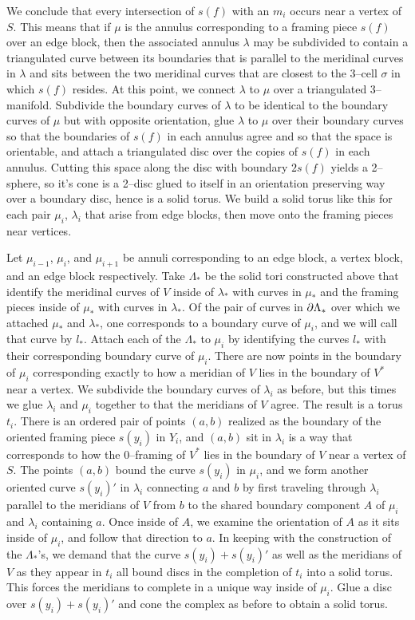 We conclude that every intersection of $s(f)$ with an $m_i$ occurs near a vertex of $S$.
This means that if $\mu$ is the annulus corresponding to a framing piece $s(f)$ over an edge block, then the associated annulus $\lambda$ may be subdivided to contain a triangulated curve between its boundaries that is parallel to the meridinal curves in $\lambda$ and sits between the two meridinal curves that are closest to the 3--cell $\sigma$ in which $s(f)$ resides.
At this point, we connect $\lambda$ to $\mu$ over a triangulated 3--manifold.
Subdivide the boundary curves of $\lambda$ to be identical to the boundary curves of $\mu$ but with opposite orientation, glue $\lambda$ to $\mu$ over their boundary curves so that the boundaries of $s(f)$ in each annulus agree and so that the space is orientable, and attach a triangulated disc over the copies of $s(f)$ in each annulus.
Cutting this space along the disc with boundary $2s(f)$ yields a 2--sphere, so it's cone is a 2--disc glued to itself in an orientation preserving way over a boundary disc, hence is a solid torus.
We build a solid torus like this for each pair $\mu_i$, $\lambda_i$ that arise from edge blocks, then move onto the framing pieces near vertices.

Let $\mu_{i-1}$, $\mu_i$, and $\mu_{i+1}$ be annuli corresponding to an edge block, a vertex block, and an edge block respectively.
Take $\Lambda_*$ be the solid tori constructed above that identify the meridinal curves of $V$ inside of $\lambda_*$ with curves in $\mu_*$ and the framing pieces inside of $\mu_*$ with curves in $\lambda_*$.
Of the pair of curves in $\partial \Lambda_*$ over which we attached $\mu_*$ and $\lambda_*$, one corresponds to a boundary curve of $\mu_i$, and we will call that curve by $l_*$.
Attach each of the $\Lambda_*$ to $\mu_i$ by identifying the curves $l_*$ with their corresponding boundary curve of $\mu_i$.
There are now points in the boundary of $\mu_i$ corresponding exactly to how a meridian of $V$ lies in the boundary of $V^*$ near a vertex.
We subdivide the boundary curves of $\lambda_i$ as before, but this times we glue $\lambda_i$ and $\mu_i$ together to that the meridians of $V$ agree.
The result is a torus $t_i$.
There is an ordered pair of points $(a,b)$ realized as the boundary of the oriented framing piece $s(y_i)$ in $Y_i$, and $(a,b)$ sit in $\lambda_i$ is a way that corresponds to how the 0--framing of $V^*$ lies in the boundary of $V$ near a vertex of $S$.
The points $(a,b)$ bound the curve $s(y_i)$ in $\mu_i$, and we form another oriented curve $s(y_i)'$ in $\lambda_i$ connecting $a$ and $b$ by first traveling through $\lambda_i$ parallel to the meridians of $V$ from $b$ to the shared boundary component $A$ of $\mu_i$ and $\lambda_i$ containing $a$.
Once inside of $A$, we examine the orientation of $A$ as it sits inside of $\mu_i$, and follow that direction to $a$.
In keeping with the construction of the $\Lambda_*$'s, we demand that the curve $s(y_i)+s(y_i)'$ as well as the meridians of $V$ as they appear in $t_i$ all bound discs in the completion of $t_i$ into a solid torus.
This forces the meridians to complete in a unique way inside of $\mu_i$.
Glue a disc over $s(y_i)+s(y_i)'$ and cone the complex as before to obtain a solid torus.

